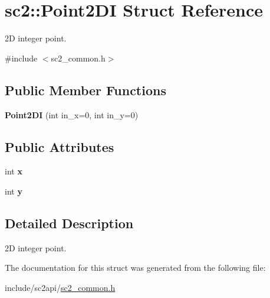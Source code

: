 \hypertarget{structsc2_1_1_point2_d_i}{}\section{sc2\+:\+:Point2\+DI Struct Reference}
\label{structsc2_1_1_point2_d_i}


2D integer point.  




{\ttfamily \#include $<$sc2\+\_\+common.\+h$>$}

\subsection*{Public Member Functions}
\begin{DoxyCompactItemize}
\item 
\mbox{\label{structsc2_1_1_point2_d_i_ab484691a214231940f68ba7d655bdc6b}} 
{\bfseries Point2\+DI} (int in\+\_\+x=0, int in\+\_\+y=0)
\end{DoxyCompactItemize}
\subsection*{Public Attributes}
\begin{DoxyCompactItemize}
\item 
\mbox{\label{structsc2_1_1_point2_d_i_a0e515ff099a006423fb65e3c8382efde}} 
int {\bfseries x}
\item 
\mbox{\label{structsc2_1_1_point2_d_i_a8fbb6f761a5c122c4f4d6d9c7664204d}} 
int {\bfseries y}
\end{DoxyCompactItemize}


\subsection{Detailed Description}
2D integer point. 

The documentation for this struct was generated from the following file\+:\begin{DoxyCompactItemize}
\item 
include/sc2api/\hyperlink{sc2__common_8h}{sc2\+\_\+common.\+h}\end{DoxyCompactItemize}
